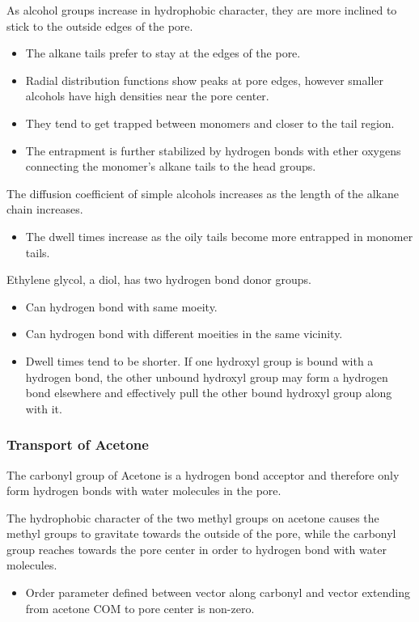 \documentclass{article}
\begin{document}
  As alcohol groups increase in hydrophobic character, they are more inclined
  to stick to the outside edges of the pore. 
  \begin{itemize}
	\item The alkane tails prefer to stay at the edges of the pore.
	\item Radial distribution functions show peaks at pore edges, however
	smaller alcohols have high densities near the pore center. 
	\item They tend to get trapped between monomers and closer to 
	the tail region. 
	\item The entrapment is further stabilized by hydrogen bonds with
	ether oxygens connecting the monomer's alkane tails to the head groups.
  \end{itemize}

  The diffusion coefficient of simple alcohols increases as the length of 
  the alkane chain increases.
  \begin{itemize}
	\item The dwell times increase as the oily tails become more
	entrapped in monomer tails.
  \end{itemize}

  Ethylene glycol, a diol, has two hydrogen bond donor groups.
  \begin{itemize}
	\item Can hydrogen bond with same moeity.
	\item Can hydrogen bond with different moeities in the same 
	vicinity. 
	\item Dwell times tend to be shorter. If one hydroxyl group is bound
	with a hydrogen bond, the other unbound hydroxyl group may form a hydrogen bond
	elsewhere and effectively pull the other bound hydroxyl group along with it. 
  \end{itemize}

  \subsubsection*{Transport of Acetone}

  The carbonyl group of Acetone is a hydrogen bond acceptor and therefore only
  form hydrogen bonds with water molecules in the pore. 

  The hydrophobic character of the two methyl groups on acetone causes the methyl
  groups to gravitate towards the outside of the pore, while the carbonyl group
  reaches towards the pore center in order to hydrogen bond with water molecules.
  \begin{itemize}
	\item Order parameter defined between vector along carbonyl and vector extending
	from acetone COM to pore center is non-zero.
  \end{itemize} 
\end{document}

